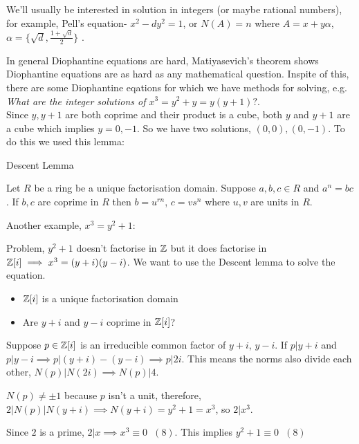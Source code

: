 \documentclass[11pt]{article}
\begin{document}
	We'll usually be interested in solution in integers (or maybe rational numbers), for example, Pell's equation- $x^2 - dy^2 = 1$, or $N(A) = n $ where $A= x + y \alpha $, $\alpha = \{ \sqrt{d},  \frac{1+\sqrt{d}}{2}\}$ .

	In general Diophantine equations are hard, Matiyasevich's theorem shows Diophantine equations are as hard as any mathematical question.
	Inspite of this, there are some Diophantine eqations for which we have methods for solving, e.g. \textit{What are the integer solutions of $x^3 = y^2 + y = y(y+1) ? $}.
	$ $\\[1em]
	Since  $y,y+1$ are both coprime and their product is a cube, both $y$ and $y+1$ are a cube which implies $y=0,-1$. So we have two solutions, $(0,0), (0,-1)$. To do this we used this lemma:


	\begin{lemma}
		Descent Lemma $ $

		Let $R$ be a ring be a unique factorisation domain. Suppose $a,b,c \in R$ and $a^n = bc$. If $b,c$ are coprime in $R$ then $b=u^{rn}$, $ c=vs^n$ where $u,v$ are units in $R$.
	\end{lemma}

Another example, $x^3 = y^2 + 1$:

	Problem, $y^2+1$ doesn't factorise in $\mathbb{Z}$ but it does factorise in $\mathbb{Z}[i] \implies x^3 = (y+i)(y-i)$. We want to use the Descent lemma to solve the equation.
	\begin{itemize}
		\item{$\mathbb{Z}[i]$ is a unique factorisation domain}
		\item{Are $y+i$ and $y-i$ coprime in $\mathbb{Z}[i]$? }
	\end{itemize}
	Suppose $p \in \mathbb{Z}[i]$ is an irreducible common factor of $y+i$, $y-i$. If $p | y+i$ and $p|y-i \implies p|(y+i) - (y-i) \implies p | 2i$. This means the norms also divide each other, $N(p) | N(2i) \implies N(p) | 4 $.

	$N(p) \neq \pm 1$ because $p$ isn't a unit, therefore,  $ 2|N(p)|N(y+i) \implies N(y+i) = y^2+1 = x^3$, so $2| x^3$.

	Since $2$ is a prime, $2|x \implies x^3 \equiv 0 \hspace{7pt} (8)$. This implies $y^2 + 1 \equiv 0\hspace{7pt} (8) $
\end{document}
